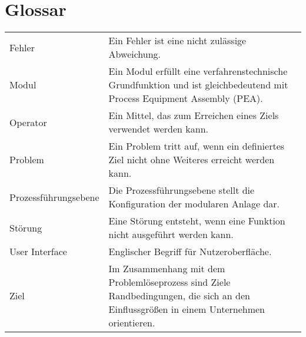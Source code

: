 \section*{Glossar}
\vspace{-0.3 cm}
\hspace{-0.3 cm}
\begin{tabular}{p{4cm}p{9cm}}
Fehler & Ein Fehler ist eine nicht zulässige Abweichung. \\
Modul & Ein Modul erfüllt eine verfahrenstechnische Grundfunktion und ist gleichbedeutend mit Process Equipment Assembly (PEA). \\
Operator & Ein Mittel, das zum Erreichen eines Ziels verwendet werden kann. \\
Problem & Ein Problem tritt auf, wenn ein definiertes Ziel nicht ohne Weiteres erreicht werden kann. \\
Prozessführungsebene & Die Prozessführungsebene stellt die Konfiguration der modularen Anlage dar.\\
Störung & Eine Störung entsteht, wenn eine Funktion nicht ausgeführt werden kann. \\
User Interface & Englischer Begriff für Nutzeroberfläche. \\
Ziel & Im Zusammenhang mit dem Problemlöseprozess sind Ziele Randbedingungen, die sich an den Einflussgrößen in einem Unternehmen orientieren. \\
\end{tabular}
